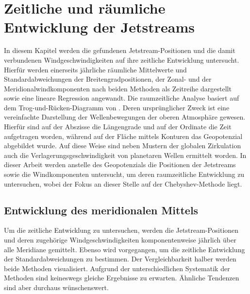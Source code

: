 \chapter[Zeitliche und räumliche Entwicklung]{Zeitliche und räumliche Entwicklung der Jetstreams}
\label{ch:klimatologie}

In diesem Kapitel werden die gefundenen Jetstream-Positionen und die damit verbundenen Windgeschwindigkeiten auf ihre zeitliche Entwicklung untersucht. Hierfür werden einerseits jährliche räumliche Mittelwerte und Standardabweichungen der Breitengradpositionen, der Zonal- und der Meridionalwindkomponenten nach beiden Methoden als Zeitreihe dargestellt sowie eine lineare Regression angewandt. Die raumzeitliche Analyse basiert auf dem Trog-und-Rücken-Diagramm von \citet{hovmoeller-1949}. Deren ursprünglicher Zweck ist eine vereinfachte Darstellung der Wellenbewegungen der oberen Atmosphäre gewesen. Hierfür sind auf der Abszisse die Längengrade und auf der Ordinate die Zeit aufgetragen worden, während auf der Fläche mittels Konturen das Geopotenzial abgebildet wurde. Auf diese Weise sind neben Mustern der globalen Zirkulation auch die Verlagerungsgeschwindigkeit von planetaren Wellen ermittelt worden. In dieser Arbeit werden anstelle des Geopotenzials die Positionen der Jetstreams sowie die Windkomponenten untersucht, um deren raumzeitliche Entwicklung zu untersuchen, wobei der Fokus an dieser Stelle auf der Chebyshev-Methode liegt.


\section{Entwicklung des meridionalen Mittels}

Um die zeitliche Entwicklung zu untersuchen, werden die Jetstream-Positionen und deren zugehörige Windgeschwindigkeiten komponentenweise jährlich über alle Meridiane gemittelt. Ebenso wird vorgegangen, um die zeitliche Entwicklung der Standardabweichungen zu bestimmen. Der Vergleichbarkeit halber werden beide Methoden visualisiert. Aufgrund der unterschiedlichen Systematik der Methoden sind keineswegs gleiche Ergebnisse zu erwarten. Ähnliche Tendenzen sind aber durchaus wünschenswert. %

